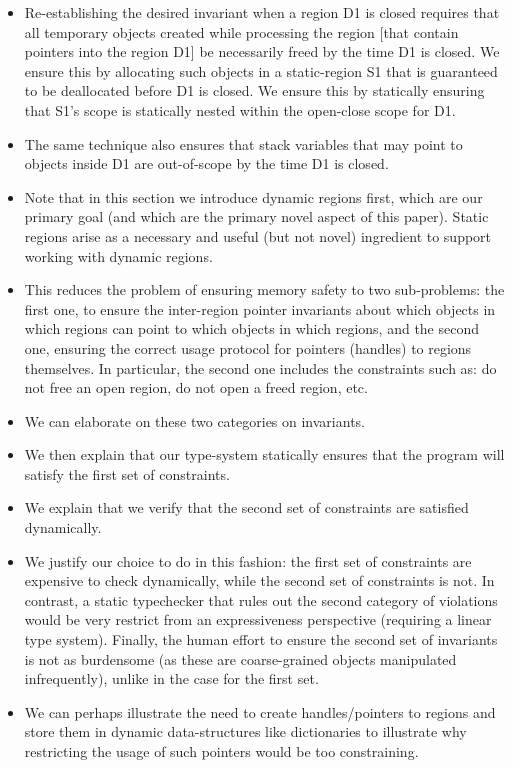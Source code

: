 \begin{itemize}
\item
Re-establishing the desired invariant when a region D1 is closed requires that all temporary objects created while processing the region [that contain pointers into the region D1] be necessarily freed by the time D1 is closed. We ensure this by allocating such objects in a static-region S1 that is guaranteed to be deallocated before D1 is closed. We ensure this by statically ensuring that S1's scope is statically nested within the open-close scope for D1.

\item
The same technique also ensures that stack variables that may point to objects inside D1 are out-of-scope by the time D1 is closed.

\item
Note that in this section we introduce dynamic regions first, which are our primary goal (and which are the primary novel aspect of this paper). Static regions arise as a necessary and useful (but not novel) ingredient to support working with dynamic regions.

\item
This reduces the problem of ensuring memory safety to two sub-problems: the first one, to ensure the inter-region pointer invariants about which objects in which regions can point to which objects in which regions, and the second one, ensuring the correct usage protocol for pointers (handles) to regions themselves. In particular, the second one includes the constraints such as: do not free an open region, do not open a freed region, etc.

\item
We can elaborate on these two categories on invariants.

\item
We then explain that our type-system statically ensures that the program will satisfy the first set of constraints.

\item
We explain that we verify that the second set of constraints are satisfied dynamically.

\item
We justify our choice to do in this fashion: the first set of constraints are expensive to check dynamically, while the second set of constraints is not. In contrast, a static typechecker that rules out the second category of violations would be very restrict from an expressiveness perspective (requiring a linear type system). Finally, the human effort to ensure the second set of invariants is not as burdensome (as these are coarse-grained objects manipulated infrequently), unlike in the case for the first set.

\item
We can perhaps illustrate the need to create handles/pointers to regions and store them in dynamic data-structures like dictionaries to illustrate why restricting the usage of such pointers would be too constraining.

\end{itemize}

